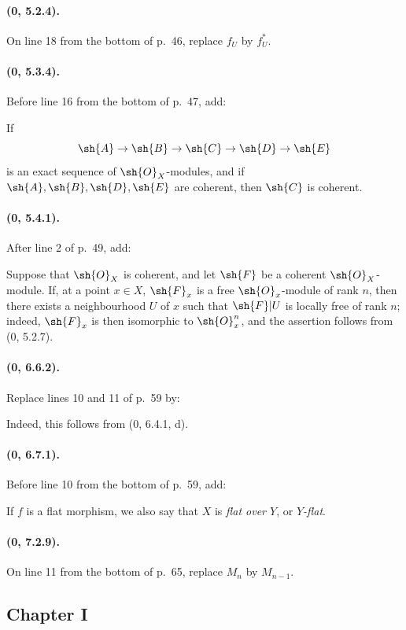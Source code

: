 \paragraph{(0, 5.2.4).}
On line 18 from the bottom of p.~46, replace $f_U$ by $f_U^*$.

\paragraph{(0, 5.3.4).}
Before line 16 from the bottom of p.~47, add:

If
\[
  \sh{A}\to\sh{B}\to\sh{C}\to\sh{D}\to\sh{E}
\]
is an exact sequence of $\sh{O}_X$-modules, and if
$\sh{A},\sh{B},\sh{D},\sh{E}$ are coherent, then $\sh{C}$ is coherent.

\paragraph{(0, 5.4.1).}
After line 2 of p.~49, add:

Suppose that $\sh{O}_X$ is coherent, and let $\sh{F}$ be a coherent
$\sh{O}_X$-module.  If, at a point $x\in X$, $\sh{F}_x$ is a free
$\sh{O}_x$-module of rank $n$, then there exists a neighbourhood $U$ of
$x$ such that $\sh{F}|U$ is locally free of rank $n$; indeed,
$\sh{F}_x$ is then isomorphic to $\sh{O}_x^n$, and the assertion follows
from (0, 5.2.7).

\paragraph{(0, 6.6.2).}
Replace lines 10 and 11 of p.~59 by:

Indeed, this follows from (0, 6.4.1, d).

\paragraph{(0, 6.7.1).}
Before line 10 from the bottom of p.~59, add:

If $f$ is a flat morphism, we also say that $X$ is \emph{flat over $Y$},
or \emph{$Y$-flat}.

\paragraph{(0, 7.2.9).}
On line 11 from the bottom of p.~65, replace $M_n$ by $M_{n-1}$.

\subsection*{Chapter I}


